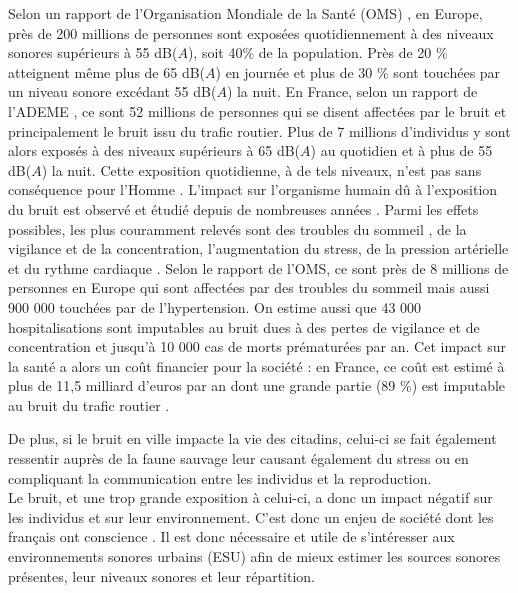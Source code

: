 Selon un rapport de l'Organisation Mondiale de la Santé (OMS) \cite{who_burden_2017}, en Europe, près de 200 millions de personnes sont exposées quotidiennement à des niveaux sonores supérieurs à 55 dB($A$), soit 40$\%$ de la population. Près de 20 $\%$ atteignent même plus de 65 dB($A$) en journée et plus de 30 $\%$ sont touchées par un niveau sonore excédant 55 dB($A$) la nuit. En France, selon un rapport de l'ADEME \cite{europeens2016analyse}, ce sont 52 millions de personnes qui se disent affectées par le bruit et principalement le bruit issu du trafic routier. Plus de 7 millions d'individus y sont alors exposés à des niveaux supérieurs à 65 dB($A$) au quotidien et à plus de 55 dB($A$) la nuit.
Cette exposition quotidienne, à de tels niveaux, n'est pas sans conséquence pour l'Homme . L'impact sur l'organisme humain dû à l'exposition du bruit est observé et étudié depuis de nombreuses années \cite{ising1980health}. Parmi les effets possibles, les plus couramment relevés sont des troubles du sommeil \cite{pirrera2010nocturnal}, de la vigilance et de la concentration, l'augmentation du stress, de la pression artérielle et du rythme cardiaque \cite{babisch2008road, babisch2005traffic}. Selon le rapport de l'OMS, ce sont près de 8 millions de personnes en Europe qui sont affectées par des troubles du sommeil mais aussi 900 000 touchées par de l'hypertension. On estime aussi que 43 000 hospitalisations sont imputables au bruit dues à des pertes de vigilance et de concentration et jusqu'à 10 000 cas de morts prématurées par an. Cet impact sur la santé a alors un coût financier pour la société : en France, ce coût est estimé à plus de 11,5 milliard d'euros par an dont une grande partie (89 $\%$) est imputable au bruit du trafic routier \cite{europeens2016analyse}.

De plus, si le bruit en ville impacte la vie des citadins, celui-ci se fait également ressentir auprès de la faune sauvage \cite{dutilleux_anthropogenic_2012, francis2009noise} leur causant également du stress ou en compliquant la communication entre les individus et la reproduction.\\

Le bruit, et une trop grande exposition à celui-ci, a donc un impact négatif sur les individus et sur leur environnement. C'est donc un enjeu de société dont les français ont conscience \cite{JNA2016etude}.
Il est donc nécessaire et utile de s'intéresser aux environnements sonores urbains (ESU) afin de mieux estimer les sources sonores présentes, leur niveaux sonores et leur répartition.

